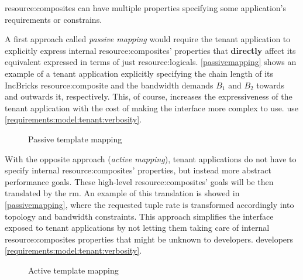 \Glspl{resource:composite} can have multiple properties specifying some application's requirements or constrains.
\ifdefined\THESISSUMMARY \else

\fi
A first approach called \textit{passive mapping} would require the tenant application to explicitly express internal \glspl{resource:composite}' properties that \textbf{directly} affect its equivalent expressed in terms of just \glspl{resource:logical}.
\ifdefined\THESISSUMMARY \else
\autoref{passivemapping} shows an example of a tenant application explicitly specifying the chain length of its IncBricks \cite{incbricks} \gls{resource:composite} and the bandwidth demands $B_1$ and $B_2$ towards and outwards it, respectively.
\fi
This, of course, increases the expressiveness of the tenant application with the cost of making the interface more complex to
\ifdefined\THESISSUMMARY
use.
\else
use \xmark \ref{requirements:model:tenant:verbosity}.
\fi
\ifdefined\THESISSUMMARY \else
\begin{figure}[!htb]
    \centering
    \usebox{\passivemapping}
    \caption{Passive template mapping}
    \label{passivemapping}
\end{figure}
\fi
\ifdefined\THESISSUMMARY \else

\fi
With the opposite approach (\textit{active mapping}), tenant applications do not have to specify internal \glspl{resource:composite}' properties, but instead more abstract performance goals.
These high-level \glspl{resource:composite}' goals will be then translated by the \gls{rm}.
\ifdefined\THESISSUMMARY \else
An example of this translation is showed in \autoref{passivemapping}, where the requested tuple rate is transformed accordingly into topology and bandwidth constraints.
\fi
This approach simplifies the interface exposed to tenant applications by not letting them taking care of internal \glspl{resource:composite} properties that might be unknown to
\ifdefined\THESISSUMMARY
developers.
\else
developers \cmark \ref{requirements:model:tenant:verbosity}.
\fi

\ifdefined\THESISSUMMARY \else
\begin{figure}[!htb]
    \centering
    \usebox{\activemapping}
    \caption{Active template mapping}
    \label{activemapping}
\end{figure}
\fi
